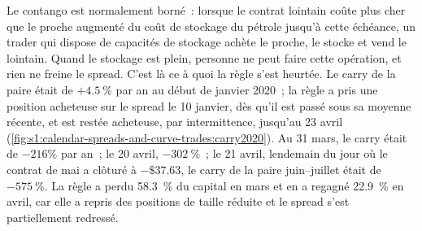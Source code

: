 Le contango est normalement borné~: lorsque le contrat lointain coûte plus cher que le proche augmenté du coût de stockage du pétrole jusqu'à cette échéance, un trader qui dispose de capacités de stockage
achète le proche, le stocke et vend le lointain. Quand le stockage est plein, personne ne peut faire cette opération, et rien ne freine le spread. C'est là ce à quoi la règle s'est heurtée.
Le carry de la paire était de $+4.5~\%$ par an au début de janvier 2020~; la règle a pris une position acheteuse sur le spread le 10 janvier, dès qu'il est passé sous sa moyenne récente, et est restée
acheteuse, par intermittence, jusqu'au 23 avril (\cref{fig:s1:calendar-spreads-and-curve-trades:carry2020}). Au 31 mars, le carry était de $-216\%$ par an~; le 20 avril,
$-302~\%$~; le 21 avril, lendemain du jour où le contrat de mai a clôturé à $-\$37.63$, le carry de la paire juin--juillet était de $-575~\%$. La règle a perdu 58.3~\% du capital en
mars et en a regagné 22.9~\% en avril, car elle a repris des positions de taille réduite et le spread s'est partiellement redressé.

\begin{omfigure}

\label{fig:s1:calendar-spreads-and-curve-trades:carry2020}
\end{omfigure}

